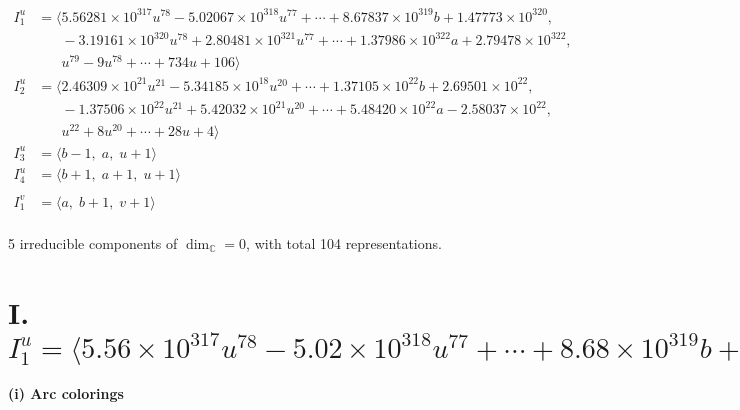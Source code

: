 \documentclass[1p]{elsarticle_modified}
\theoremstyle{definition}
\begin{document}
\begin{align*}
I^u_{1}&=\langle 
5.56281\times10^{317} u^{78}-5.02067\times10^{318} u^{77}+\cdots+8.67837\times10^{319} b+1.47773\times10^{320},\\
\phantom{I^u_{1}}&\phantom{= \langle  }-3.19161\times10^{320} u^{78}+2.80481\times10^{321} u^{77}+\cdots+1.37986\times10^{322} a+2.79478\times10^{322},\\
\phantom{I^u_{1}}&\phantom{= \langle  }u^{79}-9 u^{78}+\cdots+734 u+106\rangle \\
I^u_{2}&=\langle 
2.46309\times10^{21} u^{21}-5.34185\times10^{18} u^{20}+\cdots+1.37105\times10^{22} b+2.69501\times10^{22},\\
\phantom{I^u_{2}}&\phantom{= \langle  }-1.37506\times10^{22} u^{21}+5.42032\times10^{21} u^{20}+\cdots+5.48420\times10^{22} a-2.58037\times10^{22},\\
\phantom{I^u_{2}}&\phantom{= \langle  }u^{22}+8 u^{20}+\cdots+28 u+4\rangle \\
I^u_{3}&=\langle 
b-1,\;a,\;u+1\rangle \\
I^u_{4}&=\langle 
b+1,\;a+1,\;u+1\rangle \\
\\
I^v_{1}&=\langle 
a,\;b+1,\;v+1\rangle \\
\end{align*}
\raggedright * 5 irreducible components of $\dim_{\mathbb{C}}=0$, with total 104 representations.\\
\newpage
\renewcommand{\arraystretch}{1}
\centering \section*{I. $I^u_{1}= \langle 5.56\times10^{317} u^{78}-5.02\times10^{318} u^{77}+\cdots+8.68\times10^{319} b+1.48\times10^{320},\;-3.19\times10^{320} u^{78}+2.80\times10^{321} u^{77}+\cdots+1.38\times10^{322} a+2.79\times10^{322},\;u^{79}-9 u^{78}+\cdots+734 u+106 \rangle$}
\flushleft \textbf{(i) Arc colorings}\\
\end{document}
